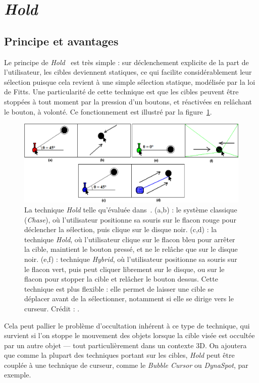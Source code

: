 \section{\emph{Hold}}
	\subsection{Principe et avantages}
	Le principe de \emph{Hold}~\cite{hajri2011moving} est très simple : sur déclenchement explicite de la part de l'utilisateur, les cibles deviennent statiques, ce qui facilite considérablement leur sélection puisque cela revient à une simple sélection statique, modélisée par la loi de Fitts. Une particularité de cette technique est que les cibles peuvent être stoppées à tout moment par la pression d'un boutons, et \og réactivées \fg{} en relâchant le bouton, à volonté. Ce fonctionnement est illustré par la figure~\ref{fig:hold}.
	
	\begin{figure}[!htb]
		\centering
		\includegraphics[width=\textwidth]{figures/ch2/hold}
		\caption[La technique \emph{Hold}]{La technique \emph{Hold} telle qu'évaluée dans~\cite{hajri2011moving}. (a,b) : le système classique (\emph{Chase}), où l'utilisateur positionne sa souris sur le flacon rouge pour déclencher la sélection, puis clique sur le disque noir. (c,d) : la technique \emph{Hold}, où l'utilisateur clique sur le flacon bleu pour arrêter la cible, maintient le bouton pressé, et ne le relâche que sur le disque noir. (e,f) : technique \emph{Hybrid}, où l'utilisateur positionne sa souris sur le flacon vert, puis peut cliquer librement sur le disque, ou sur le flacon pour stopper la cible et relâcher le bouton dessus. Cette technique est plus flexible : elle permet de laisser une cible se déplacer avant de la sélectionner, notamment si elle se dirige vers le curseur. Crédit : \cite{hajri2011moving}.}
		\label{fig:hold}
	\end{figure}
	
	Cela peut pallier le problème d'occultation inhérent à ce type de technique, qui survient si l'on stoppe le mouvement des objets lorsque la cible visée est occultée par un autre objet --- tout particulièrement dans un contexte 3D. On ajoutera que comme la plupart des techniques portant sur les cibles, \emph{Hold} peut être couplée à une technique de curseur, comme le \emph{Bubble Cursor} ou \emph{DynaSpot}, par exemple.
	
